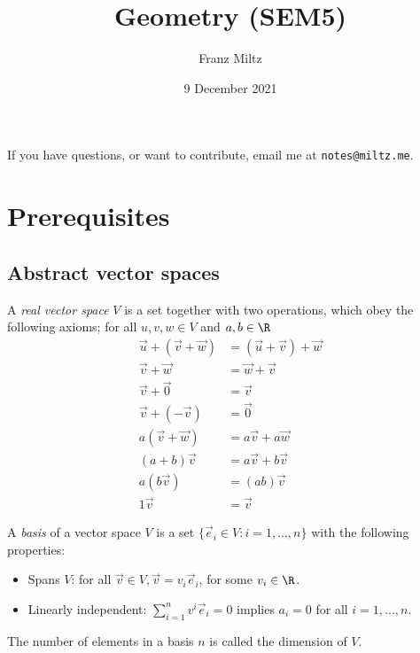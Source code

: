 \documentclass{article}
\begin{document}
\title{Geometry (SEM5)}
\author{Franz Miltz}
\date{9 December 2021}
\maketitle
\noindent If you have questions, or want to contribute, email me at \texttt{notes@miltz.me}.
\tableofcontents
\pagebreak

\section{Prerequisites}

\subsection{Abstract vector spaces}

\begin{definition}[Notes 2.1]
	A \emph{real vector space} $V$ is a set together with two operations, which obey the following
	axioms; for all $u,v,w\in V$ and $a,b\in\R$
	\begin{align*}
		\vec u + (\vec v + \vec w) & = (\vec u + \vec v) + \vec w \\
		\vec v + \vec w            & = \vec w + \vec v            \\
		\vec v + \vec 0            & = \vec v                     \\
		\vec v + (-\vec v)         & = \vec 0                     \\
		a(\vec v + \vec w)         & = a\vec v + a\vec w          \\
		(a+b)\vec v                & = a\vec v + b\vec v          \\
		a(b\vec v)                 & = (ab)\vec v                 \\
		1\vec v                    & = \vec v
	\end{align*}
\end{definition}

\begin{definition}[Notes 2.3]
	A \emph{basis} of a vector space $V$ is a set $\{\vec e_i \in V : i = 1, ..., n\}$
	with the following properties:
	\begin{itemize}
		\item Spans $V$: for all $\vec v\in V, \vec v = v_i \vec e_i$, for some $v_i\in\R$.
		\item Linearly independent: $\sum_{i=1}^n v^i\vec e_i = 0$ implies $a_i = 0$ for all $i=1,...,n$.
	\end{itemize}
	The number of elements in a basis $n$ is called the dimension of $V$.
\end{definition}
\end{document}
